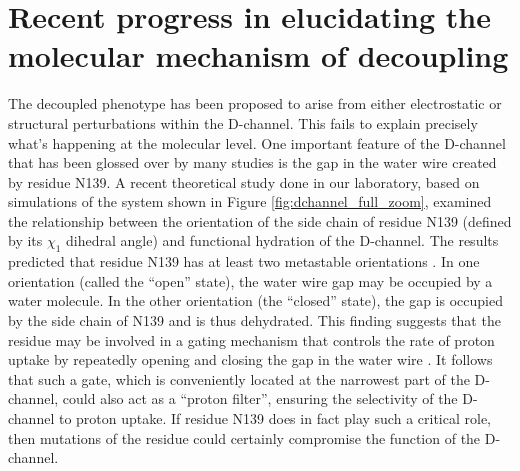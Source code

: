 \section{Recent progress in elucidating the molecular mechanism of decoupling}

The decoupled phenotype has been proposed to arise from either electrostatic or structural perturbations within the D-channel. This fails to explain precisely what's happening at the molecular level. One important feature of the D-channel that has been glossed over by many studies is the gap in the water wire created by residue N139. A recent theoretical study done in our laboratory, based on simulations of the system shown in Figure \ref{fig:dchannel_full_zoom}, examined the relationship between the orientation of the side chain of residue N139 (defined by its $\chi_1$ dihedral angle) and functional hydration of the D-channel. The results predicted that residue N139 has at least two metastable orientations \cite{Henry:2009p4543}. In one orientation (called the ``open'' state), the water wire gap may be occupied by a water molecule. In the other orientation (the ``closed'' state), the gap is occupied by the side chain of N139 and is thus dehydrated. This finding suggests that the residue may be involved in a gating mechanism that controls the rate of proton uptake by repeatedly opening and closing the gap in the water wire \cite{Henry:2009p4543}. It follows that such a gate, which is conveniently located at the narrowest part of the D-channel, could also act as a ``proton filter'', ensuring the selectivity of the D-channel to proton uptake. If residue N139 does in fact play such a critical role, then mutations of the residue could certainly compromise the function of the D-channel.

